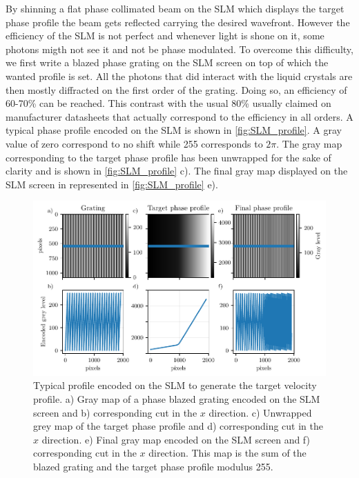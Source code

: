 \noindent By shinning a flat phase collimated beam on the SLM which displays the target phase profile the beam gets reflected carrying the desired wavefront.
However the efficiency of the SLM is not perfect and whenever light is shone on it, some photons migth not see it and not be phase modulated. To overcome this difficulty,
we first write a blazed phase grating on the SLM screen on top of which the wanted profile is set. All the photons that did interact with the liquid crystals are then mostly diffracted on the first order of the grating. Doing so,
an efficiency of 60-70\% can be reached. This contrast with the usual 80\% usually claimed on manufacturer datasheets that actually correspond to the efficiency in all orders. A typical phase profile encoded on the SLM is shown
in \autoref{fig:SLM_profile}. A gray value of zero correspond to no shift while 255 corresponds to $2\pi$. The gray map corresponding to the target phase profile has been unwrapped for the sake 
of clarity and is shown in \autoref{fig:SLM_profile} c). The final gray map displayed on the SLM screen in represented in \autoref{fig:SLM_profile} e). 

\begin{figure}
    \centering
    \hspace{-1.4cm}
    \includegraphics[width=1.1\textwidth]{appendices/fig0/slm_typical.pdf}
    \caption{Typical profile encoded on the SLM to generate the target velocity profile. a) Gray map of a phase blazed grating encoded on the SLM screen and b) corresponding cut in the 
    $x$ direction. c) Unwrapped grey map of the target phase profile and d) corresponding cut in the $x$ direction. e) Final gray map encoded on the SLM screen and f) corresponding cut in the $x$ direction. This map is the sum 
    of the blazed grating and the target phase profile modulus 255.} 
    \label{fig:SLM_profile}
\end{figure}

